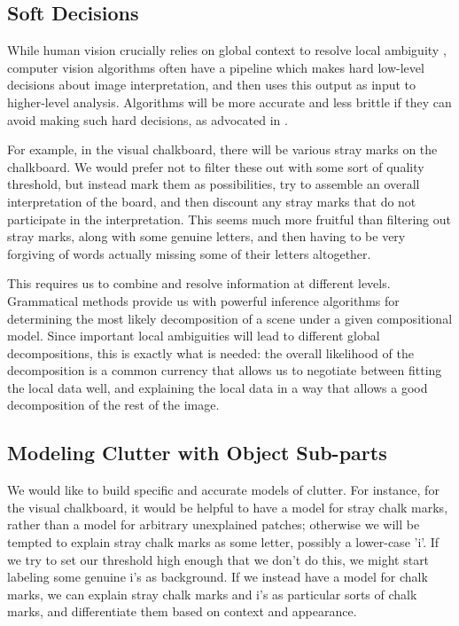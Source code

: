 \subsection{Soft Decisions}
\label{sec-soft}

While human vision crucially relies on global context to resolve local
ambiguity \cite{visual-context}, computer vision algorithms often have
a pipeline which makes hard low-level decisions about image
interpretation, and then uses this output as input to higher-level
analysis. Algorithms will be more accurate and less brittle if they
can avoid making such hard decisions, as advocated in \cite{pop,
  jin-geman}.

For example, in the visual chalkboard, there will be various stray
marks on the chalkboard. We would prefer not to filter these out with
some sort of quality threshold, but instead mark them as
possibilities, try to assemble an overall interpretation of the board,
and then discount any stray marks that do not participate in the
interpretation. This seems much more fruitful than filtering out stray
marks, along with some genuine letters, and then having to be very
forgiving of words actually missing some of their letters altogether.

This requires us to combine and resolve information at different
levels. Grammatical methods provide us with powerful inference
algorithms for determining the most likely decomposition of a scene
under a given compositional model. Since important local ambiguities
will lead to different global decompositions, this is exactly what is
needed: the overall likelihood of the decomposition is a common
currency that allows us to negotiate between fitting the local data
well, and explaining the local data in a way that allows a good
decomposition of the rest of the image.

\subsection{Modeling Clutter with Object Sub-parts}
\label{sec-clutter}

We would like to build specific and accurate models of clutter.  For
instance, for the visual chalkboard, it would be helpful to have a
model for stray chalk marks, rather than a model for arbitrary
unexplained patches; otherwise we will be tempted to explain stray
chalk marks as some letter, possibly a lower-case 'i'. If we try to
set our threshold high enough that we don't do this, we might start
labeling some genuine i's as background. If we instead have a model
for chalk marks, we can explain stray chalk marks and i's as
particular sorts of chalk marks, and differentiate them based on
context and appearance.

